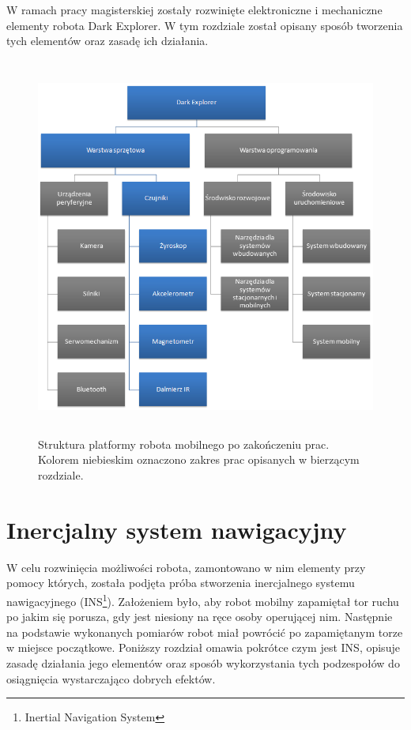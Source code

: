 W ramach pracy magisterskiej zostały rozwinięte elektroniczne i mechaniczne elementy robota Dark Explorer. W tym rozdziale został opisany sposób tworzenia tych elementów oraz zasadę ich działania.

\begin{figure}[!ht]
 \centering
 \includegraphics[height=125mm]{../images/ch04/dark_explorer_platform_hardware.png}
 \caption{Struktura platformy robota mobilnego po zakończeniu prac. Kolorem niebieskim oznaczono zakres prac opisanych w bierzącym rozdziale.}
 \label{fig:DarkExplorerPlatformHardware}
\end{figure}

\section{Inercjalny system nawigacyjny}
\label{sec:ins}
W celu rozwinięcia możliwości robota, zamontowano w nim elementy przy pomocy
których, została podjęta próba stworzenia inercjalnego systemu nawigacyjnego
(INS\footnote{Inertial Navigation System}). Założeniem było, aby robot mobilny
zapamiętał tor ruchu po jakim się porusza, gdy jest niesiony na ręce
osoby operującej nim. Następnie na podstawie wykonanych pomiarów robot miał
powrócić po zapamiętanym torze w miejsce początkowe. Poniższy rozdział omawia
pokrótce czym jest INS, opisuje zasadę działania jego elementów oraz sposób
wykorzystania tych podzespołów do osiągnięcia wystarczająco dobrych efektów.

